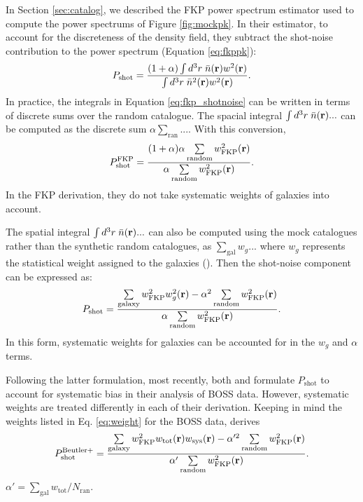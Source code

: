 \documentclass{emulateapj}
\begin{document}
In Section \ref{sec:catalog}, we described the FKP power spectrum estimator used to compute the power spectrums of Figure \ref{fig:mockpk}. In their estimator, to account for the discreteness of the density field, they subtract the shot-noise contribution to the power spectrum (Equation \ref{eq:fkppk}): 
\begin{equation}
P_\mathrm{shot} = \frac{ (1+\alpha) \int d^3r \;\bar{n}({\bf r})w^2({\bf r})}{\int d^3r \;\bar{n}^2({\bf r})w^2({\bf r})}. 
\end{equation}
In practice, the integrals in Equation \ref{eq:fkp_shotnoise} can be written in terms of discrete sums over the random catalogue. The spacial integral $\int d^3r \; \bar{n}({\bf r}) ...$ can be computed as the discrete sum $\alpha \sum_{\mathrm{ran}}...$. With this conversion,
\begin{equation} \label{eq:fkp_shotnoise}
P^\mathrm{FKP}_\mathrm{shot} = \frac{(1+\alpha) \alpha \sum\limits_{\mathrm{random}} w_\mathrm{FKP}^2({\bf r})}{\alpha \sum\limits_{\mathrm{random}}w_\mathrm{FKP}^2({\bf r})}.
\end{equation} 
In the FKP derivation, they do not take systematic weights of galaxies into account.

The spatial integral $\int d^3r \;\bar{n}({\bf r})...$ can also be computed using the mock catalogues rather than the synthetic random catalogues, as $\sum_{\mathrm{gal}} w_g...$ where $w_g$ represents the statistical weight assigned to the galaxies (\citealt{Cole:2005aa, Yamamoto:2006aa, Beutler:2014aa, Gil-Marin:2014aa}). Then the shot-noise component can be expressed as: 
\begin{equation} \label{eq:fkpweight}
P_\mathrm{shot} = \frac{ \sum\limits_{\mathrm{galaxy}} w^2_\mathrm{FKP}w^2_g({\bf r})- \alpha^2 \sum\limits_{\mathrm{random}} w_\mathrm{FKP}^2({\bf r})}{\alpha \sum\limits_{\mathrm{random}}w_\mathrm{FKP}^2({\bf r})}.
\end{equation}
In this form, systematic weights for galaxies can be accounted for in the $w_g$ and $\alpha$ terms. 

Following the latter formulation, most recently, both \cite{Beutler:2014aa} and \cite{Gil-Marin:2014aa} formulate $P_\mathrm{shot}$ to account for systematic bias in their analysis of BOSS data. However, systematic weights are treated differently in each of their derivation. Keeping in mind the weights listed in Eq. \ref{eq:weight} for the BOSS data, \cite{Beutler:2014aa} derives
\begin{equation} \label{eq:florian}
P^\mathrm{Beutler+}_\mathrm{shot} = \frac{\sum\limits_{\mathrm{galaxy}} w^2_\mathrm{FKP}w_\mathrm{tot}({\bf r})w_\mathrm{sys}({\bf r}) - \alpha'^2 \sum\limits_{\mathrm{random}} w_\mathrm{FKP}^2({\bf r})}{\alpha' \sum\limits_{\mathrm{random}}w_\mathrm{FKP}^2({\bf r})}.
\end{equation}
$\alpha' = \sum_\mathrm{gal} w_\mathrm{tot} / N_\mathrm{ran}$. 
\end{document}
